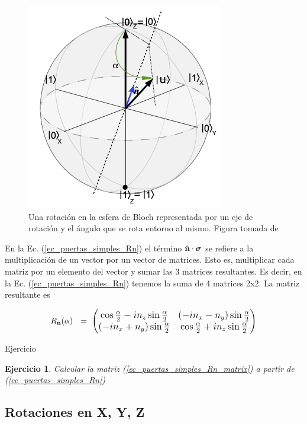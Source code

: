 \documentclass[a4paper,11pt]{book} %
\newtheorem{ejercicio_contador}{Ejercicio}
\newcommand{\Ejercicio}[1]{
		\begin{mybox_gray}{Ejercicio} 
			\begin{ejercicio_contador}
				 #1 
			\end{ejercicio_contador} 
		\end{mybox_gray}
	}
\numberwithin{equation}{chapter}
\def\lp{\left(}
\def\rp{\right)}
\begin{document}
	\begin{figure}[H]
	\centering 
	\includegraphics[width=0.3\linewidth]{Figuras/Fig_puertas_simples_BlochSphere_rot.png}
	\caption{Una rotación en la esfera de Bloch representada por un eje de rotación y el ángulo que se rota entorno al mismo. Figura tomada de \cite{Curso-JMas}}
	\label{Fig_puertas_simples_BlochSphere_rot.png}
	\end{figure}

En la Ec. (\ref{ec_puertas_simples_Rn}) el término $\hat{\bf n}\cdot \boldsymbol{\sigma}$ se refiere a la multiplicación de un vector por un vector de matrices. Esto es, multiplicar cada matriz por un elemento del vector y sumar las 3 matrices resultantes. Es decir, en la Ec. (\ref{ec_puertas_simples_Rn}) tenemos la suma de 4 matrices 2x2. La matriz resultante es
	
	\begin{equation} \label{ec_puertas_simples_Rn_matrix}
	R_{\hat{\bf n}}(\alpha)~  ~=~ \large{\lp \begin{matrix} 
	\cos \frac{\alpha}{2} - i n_z\sin\frac{\alpha}{2} 
	& (-in_x- n_y)\sin\frac{\alpha}{2} \\ 
	(-in_x + n_y) \sin\frac{\alpha}{2} 
	&  \cos \frac{\alpha}{2} + i n_z\sin\frac{\alpha}{2} 
	\end{matrix} \rp}
	\end{equation}
			

\Ejercicio{Calcular la matriz (\ref{ec_puertas_simples_Rn_matrix}) a partir de (\ref{ec_puertas_simples_Rn})}

        \subsection{Rotaciones en X, Y, Z}
\end{document}
